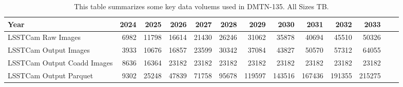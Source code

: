 \tiny \begin{longtable} { |p{}  |r  |r  |r  |r  |r  |r  |r  |r  |r  |r  |r  |r |} 
\caption{This table summarizes some key data voluems used in DMTN-135. All Sizes TB. \label{tab:sizesImages}}\\ 
\hline 
\textbf{Year}&\textbf{2024}&\textbf{2025}&\textbf{2026}&\textbf{2027}&\textbf{2028}&\textbf{2029}&\textbf{2030}&\textbf{2031}&\textbf{2032}&\textbf{2033}& \\ \hline
{LSSTCam Raw Images}&{6982}&{11798}&{16614}&{21430}&{26246}&{31062}&{35878}&{40694}&{45510}&{50326}& \\ \hline
{LSSTCam Output Images}&{3933}&{10676}&{16857}&{23599}&{30342}&{37084}&{43827}&{50570}&{57312}&{64055}& \\ \hline
{LSSTCam Output Coadd Images}&{8636}&{16364}&{23182}&{23182}&{23182}&{23182}&{23182}&{23182}&{23182}&{23182}& \\ \hline
{LSSTCam Output Parquet}&{9302}&{25248}&{47839}&{71758}&{95678}&{119597}&{143516}&{167436}&{191355}&{215275}& \\ \hline
\end{longtable} \normalsize
